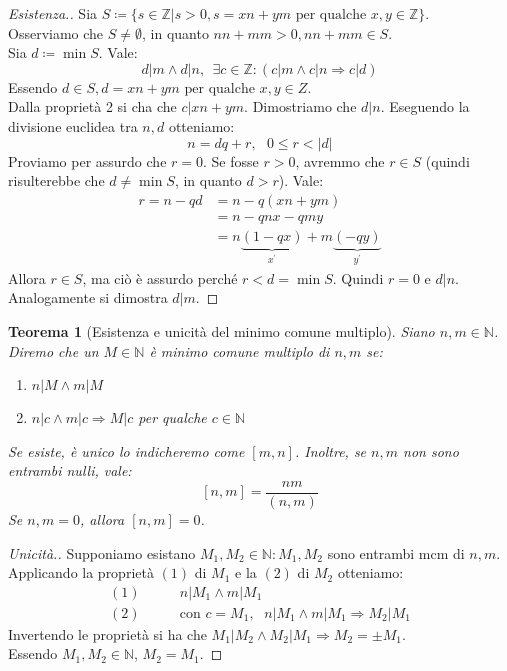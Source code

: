 \documentclass[12pt,twoscolu]{article}
\newcommand{\N}{\mathbb{N}}
\newcommand{\Z}{\mathbb{Z}}
\newcommand{\implica}{\Longrightarrow}
\newcommand{\pr}{\prime}
\newcommand{\pq}{\text{ per qualche }}
\renewcommand\qedsymbol{$\blacksquare$}
\newtheorem{theorem}{Teorema}
\begin{document}
\renewcommand\qedsymbol{$\blacksquare$}
\begin{proof}[Esistenza.]
Sia $S \coloneqq \{ s \in \Z | s > 0, s = xn + ym \text{ per qualche } x, y \in \Z\}$.
\\Osserviamo che $S \ne \emptyset$, in quanto $nn + mm > 0, nn + mm \in S$.
\\Sia $d \coloneqq \min S$. Vale:
$$ d | m \land d | n ,\ \ \exists c \in \Z : (c | m \land c | n \implica c | d)$$
Essendo $d \in S, d = xn+ym \pq x, y \in Z$.
\\Dalla proprietà 2 si cha che $c | xn + ym$. Dimostriamo che $d | n$. Eseguendo la divisione euclidea tra $n, d$ otteniamo:
$$n = dq + r, \text{ } 0 \le r < |d|$$
Proviamo per assurdo che $r = 0$. Se fosse $r > 0$, avremmo che $r \in S$ (quindi risulterebbe che $d \ne \min S$, in quanto $d > r$). Vale:
\begin{align*} 
r = n - qd &= n - q(xn+ym) \\
&= n - qnx - qmy \\
&= n\underbrace{(1-qx)}_{x^{\pr}} + m\underbrace{(-qy)}_{y^{\pr}}
\end{align*}
Allora $r \in S$, ma ciò è assurdo perché $r < d = \min S$. Quindi $r = 0$ e $d|n$. Analogamente si dimostra $d | m$.
\end{proof}

\begin{theorem}[Esistenza e unicità del minimo comune multiplo]
Siano $n, m \in \N$. Diremo che un $M \in \N$ è minimo comune multiplo di $n, m$ se:
\begin{enumerate}
\item$n | M \land m | M $
\item$n | c \land m | c \implica M | c$ per qualche $c \in \N$
\end{enumerate}
Se esiste, è unico lo indicheremo come $[m, n]$. Inoltre, se $n, m$ non sono entrambi nulli, vale:
$$[n, m] = \frac{nm}{(n, m)}$$
Se $n, m = 0$, allora $ [n, m] = 0$.
\end{theorem}

\renewcommand\qedsymbol{$\square$}
\begin{proof}[Unicità.]
Supponiamo esistano $M_1, M_2 \in \N : M_1, M_2$ sono entrambi mcm di $n, m$.
Applicando la proprietà $(1)$ di $M_1$ e la $(2)$ di $M_2$ otteniamo:
\begin{align*}
(1)\qquad& n | M_1 \land m | M_1 \\
(2)\qquad&\text{con } c = M_1 \text{, } \ \ n | M_1 \land m | M_1 \implica M_2 | M_1
\end{align*}
Invertendo le proprietà si ha che $M_1 | M_2 \land M_2 | M_1 \implica M_2 = \pm M_1$.
\\Essendo $M_1, M_2 \in \N$, $M_2 = M_1$.
\end{proof}
\end{document}
